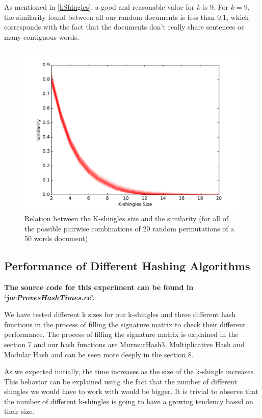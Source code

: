 \documentclass[12pt]{article}
\begin{document}
{As mentioned in \autoref{kShingles}, a good and reasonable value for $k$ is 9.
For $k = 9$, the similarity found between all our random documents is less than 0.1, which corresponds with the fact that the documents don't really share sentences or many contiguous words.

\begin{figure}[H]
	\centering
	\includegraphics[scale=0.5]{graphs/JaccardSimilarityValueKshingles.pdf} 
	\caption{Relation between the K-shingles size and the similarity (for all of the possible pairwise combinations of 20 random permutations of a 50 words document)}
	\label{fig:KShinglesSimilarity}
\end{figure}

\subsection{Performance of Different Hashing Algorithms}
\textbf{The source code for this experiment can be found in `\textit{jocProvesHashTimes.cc}'.}
\bigskip

We have tested different k sizes for our k-shingles and three different hash functions in the process of filling the signature matrix to check their different performance. The process of filling the signature matrix is explained in the section 7 and our hash functions are MurmurHash3, Multiplicative Hash and Modular Hash and can be seen more deeply in the section 8.

As we expected initially, the time increases as the size of the k-shingle increases. This behavior can be explained using the fact that the number of different shingles we would have to work with would be bigger. It is trivial to observe that the number of different k-shingles is going to have a growing tendency based on their size. 

}
\end{document}
